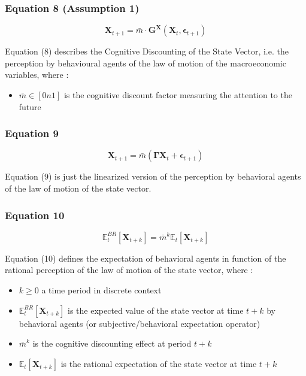 \documentclass{article}
\begin{document}
\subsubsection*{Equation 8 (Assumption 1)}

\begin{equation}
    \bm{X}_{t+1}=\bar{m}\cdot\bm{G}^{\bm{X}}(\bm{X}_{t},\bm{\epsilon}_{t+1})
\end{equation}

Equation (8) describes the Cognitive Discounting of the State Vector, i.e. the perception by behavioural agents of the law of motion of the macroeconomic variables, where : 
\begin{itemize}
    \item $\bar{m}\in\left[0n1\right]$ is the cognitive discount factor measuring the attention to the future
\end{itemize}

\subsubsection*{Equation 9}

\begin{equation}
    \bm{X}_{t+1}=\bar{m}(\bm{\Gamma}\bm{X}_{t}+\bm{\epsilon}_{t+1})
\end{equation}

Equation (9) is just the linearized version of the perception by behavioral agents of the law of motion of the state vector. 

\subsubsection*{Equation 10}

\begin{equation}
    \mathbb{E}_{t}^{BR}\left[\bm{X}_{t+k}\right]=\bar{m}^{k}\mathbb{E}_{t}\left[\bm{X}_{t+k}\right]
\end{equation}

Equation (10) defines the expectation of behavioral agents in function of the rational perception of the law of motion of the state vector, where : 
\begin{itemize}
    \item $k\geq 0$ a time period in discrete context
    \item $\mathbb{E}_{t}^{BR}\left[\bm{X}_{t+k}\right]$ is the expected value of the state vector at time $t+k$ by behavioral agents (or subjective/behavioral expectation operator)
    \item $\bar{m}^{k}$ is the cognitive discounting effect at period $t+k$
    \item $\mathbb{E}_{t}\left[\bm{X}_{t+k}\right]$ is the rational expectation of the state vector at time $t+k$
\end{itemize}
\end{document}
